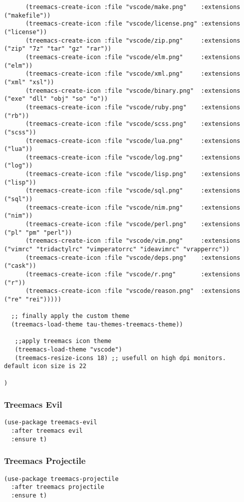 \documentclass[11pt]{article}
\begin{document}
\begin{verbatim}
      (treemacs-create-icon :file "vscode/make.png"    :extensions ("makefile"))
      (treemacs-create-icon :file "vscode/license.png" :extensions ("license"))
      (treemacs-create-icon :file "vscode/zip.png"     :extensions ("zip" "7z" "tar" "gz" "rar"))
      (treemacs-create-icon :file "vscode/elm.png"     :extensions ("elm"))
      (treemacs-create-icon :file "vscode/xml.png"     :extensions ("xml" "xsl"))
      (treemacs-create-icon :file "vscode/binary.png"  :extensions ("exe" "dll" "obj" "so" "o"))
      (treemacs-create-icon :file "vscode/ruby.png"    :extensions ("rb"))
      (treemacs-create-icon :file "vscode/scss.png"    :extensions ("scss"))
      (treemacs-create-icon :file "vscode/lua.png"     :extensions ("lua"))
      (treemacs-create-icon :file "vscode/log.png"     :extensions ("log"))
      (treemacs-create-icon :file "vscode/lisp.png"    :extensions ("lisp"))
      (treemacs-create-icon :file "vscode/sql.png"     :extensions ("sql"))
      (treemacs-create-icon :file "vscode/nim.png"     :extensions ("nim"))
      (treemacs-create-icon :file "vscode/perl.png"    :extensions ("pl" "pm" "perl"))
      (treemacs-create-icon :file "vscode/vim.png"     :extensions ("vimrc" "tridactylrc" "vimperatorrc" "ideavimrc" "vrapperrc"))
      (treemacs-create-icon :file "vscode/deps.png"    :extensions ("cask"))
      (treemacs-create-icon :file "vscode/r.png"       :extensions ("r"))
      (treemacs-create-icon :file "vscode/reason.png"  :extensions ("re" "rei")))))

  ;; finally apply the custom theme
  (treemacs-load-theme tau-themes-treemacs-theme))

   ;;apply treemacs icon theme
   (treemacs-load-theme "vscode")
   (treemacs-resize-icons 18) ;; usefull on high dpi monitors.  default icon size is 22

)
\end{verbatim}

\subsubsection*{Treemacs Evil}
\label{sec:orgeab1d9c}
\begin{verbatim}
(use-package treemacs-evil
  :after treemacs evil
  :ensure t)
\end{verbatim}

\subsubsection*{Treemacs Projectile}
\label{sec:org653b661}
\begin{verbatim}
(use-package treemacs-projectile
  :after treemacs projectile
  :ensure t)
\end{verbatim}
\end{document}
